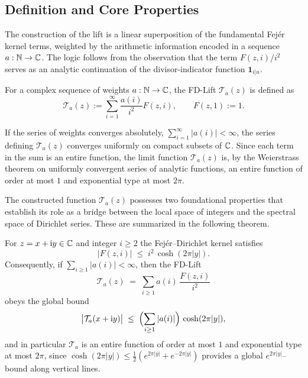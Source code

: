 \subsection{Definition and Core Properties}

The construction of the lift is a linear superposition of the fundamental Fej\'er kernel terms, weighted by the arithmetic information encoded in a sequence $a:\mathbb{N} \to \mathbb{C}$. The logic follows from the observation that the term $F(z,i)/i^2$ serves as an analytic continuation of the divisor-indicator function $\mathbf{1}_{i|n}$.

\begin{definition}
For a complex sequence of weights $a:\mathbb{N} \to \mathbb{C}$, the FD-Lift $\mathcal{T}_a(z)$ is defined as
\[
\mathcal{T}_a(z) := \sum_{i=1}^{\infty} \frac{a(i)}{i^2} F(z,i),\qquad F(z,1):=1.
\]
\end{definition}

If the series of weights converges absolutely, $\sum_{i=1}^{\infty} |a(i)| < \infty$, the series defining $\mathcal{T}_a(z)$ converges uniformly on compact subsets of $\mathbb{C}$. Since each term in the sum is an entire function, the limit function $\mathcal{T}_a(z)$ is, by the Weierstrass theorem on uniformly convergent series of analytic functions, an entire function of order at most $1$ and exponential type at most $2\pi$.

The constructed function $\mathcal{T}_a(z)$ possesses two foundational properties that establish its role as a bridge between the local space of integers and the spectral space of Dirichlet series. These are summarized in the following theorem.

\begin{lemma}\label{lem:growth-type}
For $z=x+\mathrm{i}y\in\mathbb{C}$ and integer $i\ge2$ the Fej\'er–Dirichlet kernel satisfies
\[
\bigl|F(z,i)\bigr|\;\le\; i^2\,\cosh(2\pi|y|).
\]
Consequently, if $\sum_{i\ge1}|a(i)|<\infty$, then the FD-Lift
\[
\mathcal{T}_a(z)\;=\;\sum_{i\ge1} a(i)\,\frac{F(z,i)}{i^2}
\]
obeys the global bound
\[
\bigl|\mathcal{T}_a(x+\mathrm{i}y)\bigr|\;\le\;\Bigl(\sum_{i\ge1}|a(i)|\Bigr)\,\cosh(2\pi|y|),
\]
and in particular $\mathcal{T}_a$ is an entire function of order at most $1$ and exponential type at most $2\pi$, since $\cosh(2\pi|y|)\le \tfrac12(e^{2\pi|y|}+e^{-2\pi|y|})$ provides a global $e^{2\pi|y|}$–bound along vertical lines.
\end{lemma}

